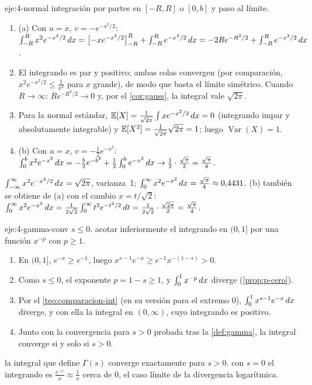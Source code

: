 \begin{solucion}{eje:4-normal}
\planteamiento integración por partes en $[-R,R]$ o $[0,b]$ y paso al límite.
\pasos
\begin{enumerate}[label=\arabic*.]
  \item (a) Con $u=x$, $v=-e^{-x^{2}/2}$: $\int_{-R}^{R}x^{2}e^{-x^{2}/2}\mathop{}\!d x=\bigl[-xe^{-x^{2}/2}\bigr]_{-R}^{R}+\int_{-R}^{R}e^{-x^{2}/2}\mathop{}\!d x=-2Re^{-R^{2}/2}+\int_{-R}^{R}e^{-x^{2}/2}\mathop{}\!d x$.
  \item El integrando es par y positivo; ambas colas convergen (por comparación, $x^{2}e^{-x^{2}/2}\le\frac{1}{x^{2}}$ para $x$ grande), de modo que basta el límite simétrico. Cuando $R\to\infty$: $Re^{-R^{2}/2}\to0$ y, por el \cref{cor:gauss}, la integral vale $\sqrt{2\pi}$.
  \item Para la normal estándar, $\mathbb{E}[X]=\frac{1}{\sqrt{2\pi}}\int xe^{-x^{2}/2}\mathop{}\!d x=0$ (integrando impar y absolutamente integrable) y $\mathbb{E}[X^{2}]=\frac{1}{\sqrt{2\pi}}\sqrt{2\pi}=1$; luego $\operatorname{Var}(X)=1$.
  \item (b) Con $u=x$, $v=-\frac12e^{-x^{2}}$: $\int_0^{b}x^{2}e^{-x^{2}}\mathop{}\!d x=-\frac b2e^{-b^{2}}+\frac12\int_0^{b}e^{-x^{2}}\mathop{}\!d x\to\frac12\cdot\frac{\sqrt\pi}{2}=\frac{\sqrt\pi}{4}$.
\end{enumerate}
\resultado $\int_{-\infty}^{\infty}x^{2}e^{-x^{2}/2}\mathop{}\!d x=\sqrt{2\pi}$, varianza~1; $\int_0^{\infty}x^{2}e^{-x^{2}}\mathop{}\!d x=\frac{\sqrt\pi}{4}\approx0{,}4431$.
\comprobacion (b) también se obtiene de (a) con el cambio $x=t/\sqrt2$: $\int_0^{\infty}x^{2}e^{-x^{2}}\mathop{}\!d x=\frac{1}{2\sqrt2}\int_0^{\infty}t^{2}e^{-t^{2}/2}\mathop{}\!d t=\frac{1}{2\sqrt2}\cdot\frac{\sqrt{2\pi}}{2}=\frac{\sqrt\pi}{4}$.
\end{solucion}

\begin{solucion}{eje:4-gamma-conv}
\datos $s\le0$.
\planteamiento acotar inferiormente el integrando en $(0,1]$ por una función $x^{-p}$ con $p\ge1$.
\pasos
\begin{enumerate}[label=\arabic*.]
  \item En $(0,1]$, $e^{-x}\ge e^{-1}$, luego $x^{s-1}e^{-x}\ge e^{-1}x^{-(1-s)}>0$.
  \item Como $s\le0$, el exponente $p=1-s\ge1$, y $\int_0^{1}x^{-p}\mathop{}\!d x$ diverge (\cref{prop:p-cero}).
  \item Por el \cref{teo:comparacion-int} (en su versión para el extremo $0$), $\int_0^{1}x^{s-1}e^{-x}\mathop{}\!d x$ diverge, y con ella la integral en $(0,\infty)$, cuyo integrando es positivo.
  \item Junto con la convergencia para $s>0$ probada tras la \cref{def:gamma}, la integral converge si y solo si $s>0$.
\end{enumerate}
\resultado la integral que define $\Gamma(s)$ converge exactamente para $s>0$.
\comprobacion con $s=0$ el integrando es $\frac{e^{-x}}{x}\approx\frac1x$ cerca de $0$, el caso límite de la divergencia logarítmica.
\end{solucion}

